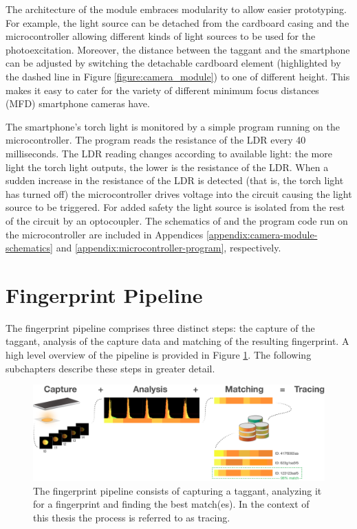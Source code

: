 \documentclass[thesis.tex]{subfiles}
\begin{document}
The architecture of the module embraces modularity to allow easier prototyping. For example, the light source can be detached from the cardboard casing and the microcontroller allowing different kinds of light sources to be used for the photoexcitation. Moreover, the distance between the taggant and the smartphone can be adjusted by switching the detachable cardboard element (highlighted by the dashed line in Figure \ref{figure:camera_module}) to one of different height. This makes it easy to cater for the variety of different minimum focus distances (MFD) smartphone cameras have.

The smartphone's torch light is monitored by a simple program running on the microcontroller. The program reads the resistance of the LDR every 40 milliseconds. The LDR reading changes according to available light: the more light the torch light outputs, the lower is the resistance of the LDR. When a sudden increase in the resistance of the LDR is detected (that is, the torch light has turned off) the microcontroller drives voltage into the circuit causing the light source to be triggered. For added safety the light source is isolated from the rest of the circuit by an optocoupler. The schematics of and the program code run on the microcontroller are included in Appendices \ref{appendix:camera-module-schematics} and \ref{appendix:microcontroller-program}, respectively.

\section{Fingerprint Pipeline}
\label{chapter:fingerprint-pipeline}

The fingerprint pipeline comprises three distinct steps: the capture of the taggant, analysis of the capture data and matching of the resulting fingerprint. A high level overview of the pipeline is provided in Figure \ref{figure:fingerprint-pipeline}. The following subchapters describe these steps in greater detail.

\begin{figure}[h]
\centering \includegraphics[width=\textwidth,height=\textheight,keepaspectratio=true]{images/design_implementation/fingerprint_pipeline.pdf}
\caption{The fingerprint pipeline consists of capturing a taggant, analyzing it for a fingerprint and finding the best match(es). In the context of this thesis the process is referred to as tracing. \label{figure:fingerprint-pipeline}}
\end{figure}
\end{document}

